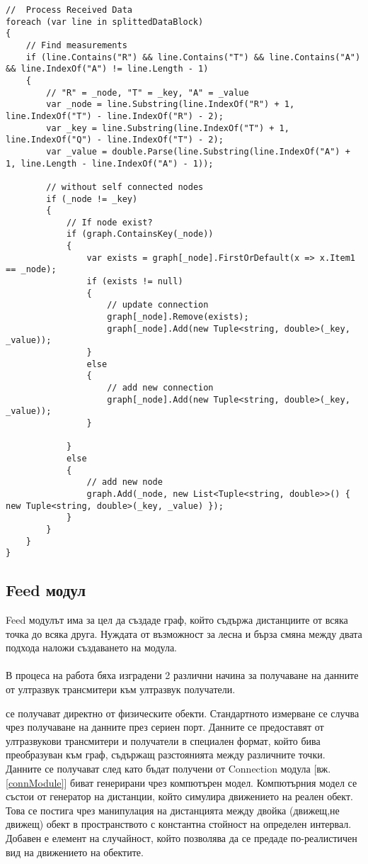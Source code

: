 \begin{lstlisting}
//  Process Received Data   
foreach (var line in splittedDataBlock)
{
    // Find measurements
    if (line.Contains("R") && line.Contains("T") && line.Contains("A") && line.IndexOf("A") != line.Length - 1)
    {
        // "R" = _node, "T" = _key, "A" = _value 
        var _node = line.Substring(line.IndexOf("R") + 1, line.IndexOf("T") - line.IndexOf("R") - 2);
        var _key = line.Substring(line.IndexOf("T") + 1, line.IndexOf("Q") - line.IndexOf("T") - 2);
        var _value = double.Parse(line.Substring(line.IndexOf("A") + 1, line.Length - line.IndexOf("A") - 1));

        // without self connected nodes
        if (_node != _key)
        {
            // If node exist?
            if (graph.ContainsKey(_node))
            {
                var exists = graph[_node].FirstOrDefault(x => x.Item1 == _node);
                if (exists != null)
                {
                    // update connection
                    graph[_node].Remove(exists);
                    graph[_node].Add(new Tuple<string, double>(_key, _value));
                }
                else
                {
                    // add new connection
                    graph[_node].Add(new Tuple<string, double>(_key, _value));
                }

            }
            else
            {
                // add new node
                graph.Add(_node, new List<Tuple<string, double>>() { new Tuple<string, double>(_key, _value) });
            }
        }
    }
}
\end{lstlisting}


\subsection{Feed модул}
Feed модулът има за цел да създаде граф, който съдържа дистанциите от всяка точка до всяка друга. Нуждата от възможност за лесна и бърза смяна между двата подхода наложи създаването на модула.\\\\
В процеса на работа бяха изградени 2 различни начина за получаване на данните от ултразвук трансмитери към ултразвук получатели. 
\begin{enumerate}
     се получават директно от физическите обекти. Стандартното измерване се случва чрез получаване на данните през сериен порт. Данните се предоставят от ултразвукови трансмитери и получатели в специален формат, който бива преобразуван към граф, съдържащ разстоянията между различните точки. Данните се получават след като бъдат получени от Connection модула [вж. \ref{connModule}]
     биват генерирани чрез компютърен модел. Компютърния модел се състои от генератор на дистанции, който симулира движението на реален обект. Това се постига чрез манипулация на дистанцията между двойка (движещ,не движещ) обект в пространството с константна стойност на определен интервал. Добавен е елемент на случайност, който позволява да се предаде по-реалистичен вид на движението на обектите.
\end{enumerate}

